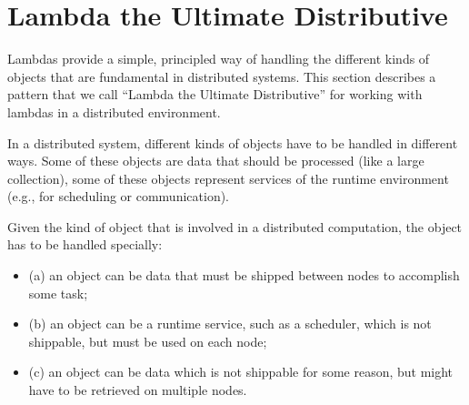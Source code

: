 \documentclass{llncs}
\begin{document}


\section{Lambda the Ultimate Distributive}

Lambdas provide a simple, principled way of handling the different kinds of
objects that are fundamental in distributed systems. This section describes a
pattern that we call ``Lambda the Ultimate Distributive'' for working with
lambdas in a distributed environment.

In a distributed system, different kinds of objects have to be handled in
different ways. Some of these objects are data that should be processed (like
a large collection), some of these objects represent services of the runtime
environment (e.g., for scheduling or communication).

Given the kind of object that is involved in a distributed computation, the
object has to be handled specially:
\begin{itemize}

\item (a) an object can be data that must be shipped between nodes to accomplish
some task;

\item (b) an object can be a runtime service, such as a scheduler, which is not
shippable, but must be used on each node;

\item (c) an object can be data which is not shippable for some reason, but might
have to be retrieved on multiple nodes.

\end{itemize}
\end{document}
